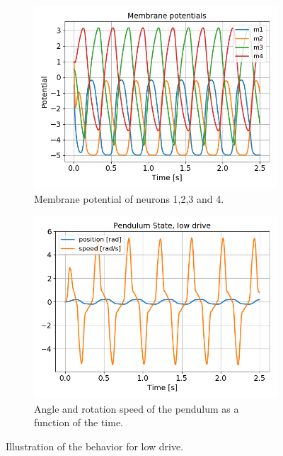 \documentclass{cmc}
\begin{document}
\begin{figure}[ht]
  \begin{subfigure}[b]{0.48\textwidth}
    \includegraphics[width=\textwidth]{figures/Exercise3/MembranePotentialslowdrive.png}
    \caption{Membrane potential of neurons 1,2,3 and 4.}
    \label{fig:ex3-membrane-low}
  \end{subfigure}
  \begin{subfigure}[b]{0.48\textwidth}
    \includegraphics[width=\textwidth]{figures/Exercise3/PendulumStatelowdrive.png}
    \caption{Angle and rotation speed of the pendulum as a function of the time.}
    \label{fig:ex3-state-low}
  \end{subfigure}
  \caption{Illustration of the behavior for low drive.}
  \label{fig:ex3-low}
\end{figure}
\end{document}
